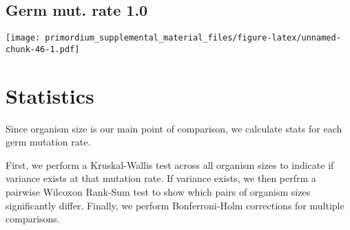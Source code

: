 \documentclass[]{book}
\newenvironment{Shaded}{\begin{snugshade}}{\end{snugshade}}
\newcommand{\ControlFlowTok}[1]{\textcolor[rgb]{0.13,0.29,0.53}{\textbf{#1}}}
\newcommand{\DataTypeTok}[1]{\textcolor[rgb]{0.13,0.29,0.53}{#1}}
\newcommand{\DecValTok}[1]{\textcolor[rgb]{0.00,0.00,0.81}{#1}}
\newcommand{\FloatTok}[1]{\textcolor[rgb]{0.00,0.00,0.81}{#1}}
\newcommand{\KeywordTok}[1]{\textcolor[rgb]{0.13,0.29,0.53}{\textbf{#1}}}
\newcommand{\NormalTok}[1]{#1}
\newcommand{\OperatorTok}[1]{\textcolor[rgb]{0.81,0.36,0.00}{\textbf{#1}}}
\newcommand{\StringTok}[1]{\textcolor[rgb]{0.31,0.60,0.02}{#1}}
\begin{document}
\hypertarget{germ-mut.-rate-1.0}{%
\subsection{Germ mut. rate 1.0}\label{germ-mut.-rate-1.0}}

\texttt{[image: primordium\_supplemental\_material\_files/figure-latex/unnamed-chunk-46-1.pdf]}

\hypertarget{statistics-1}{%
\section{Statistics}\label{statistics-1}}

Since organism size is our main point of comparison, we calculate stats for each germ mutation rate.

First, we perform a Kruskal-Wallis test across all organism sizes to indicate if variance exists at that mutation rate.
If variance exists, we then perfrm a pairwise Wilcoxon Rank-Sum test to show which pairs of organism sizes significantly differ.
Finally, we perform Bonferroni-Holm corrections for multiple comparisons.

\begin{Shaded}
\end{Shaded}
\end{document}
